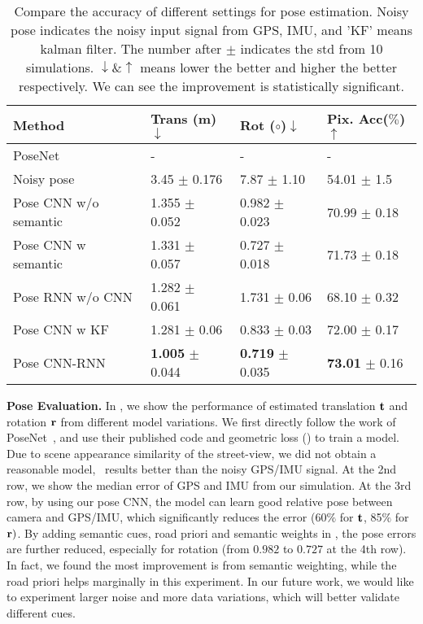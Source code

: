 \begin{table}
\vspace{-0\baselineskip}
\center
\fontsize{7}{8}\selectfont
\hspace*{-0.33cm}

\begin{tabular}{llll}
\toprule[0.1 em]
Method & Trans (m) $\downarrow$ & Rot ($\circ$)$\downarrow$  & Pix. Acc($\%$)$\uparrow$ \\
\hline
PoseNet~\cite{kendall2017geometric} & -  & -  & -  \\
Noisy pose & 3.45 $\pm$ 0.176 & 7.87 $\pm$ 1.10 & 54.01 $\pm$ 1.5 \\
Pose CNN w/o semantic & 1.355 $\pm$ 0.052  & 0.982 $\pm$ 0.023 & 70.99 $\pm$ 0.18 \\
Pose CNN w semantic & 1.331 $\pm$ 0.057  & 0.727 $\pm$ 0.018 & 71.73 $\pm$ 0.18  \\
Pose RNN w/o CNN & 1.282 $\pm$ 0.061  & 1.731 $\pm$ 0.06 &  68.10 $\pm$ 0.32 \\
Pose CNN w KF & 1.281 $\pm$ 0.06  & 0.833 $\pm$ 0.03 & 72.00 $\pm$ 0.17  \\
Pose CNN-RNN  & \textbf{1.005} $\pm$ 0.044  & \textbf{0.719} $\pm$ 0.035  & \textbf{73.01} $\pm$ 0.16  \\
\toprule[0.1 em]
\end{tabular}
\caption{Compare the accuracy of different settings for pose estimation.
Noisy pose indicates the noisy input signal from GPS, IMU, and 'KF' means kalman filter.
The number after $\pm$ indicates the std from 10 simulations. $\downarrow \& \uparrow$ means lower the better and higher the better respectively. 
We can see the improvement is statistically significant.}
\label{tbl:pose}
\vspace{-1.5\baselineskip}
\end{table}

\textbf{Pose Evaluation.}
In , we show the performance of estimated translation ${\mathbf t}$ and rotation ${\mathbf r}$ from different model variations. We first directly follow the work of PoseNet~\cite{Kendall_2015_ICCV,kendall2017geometric}, and use their published code and geometric loss () to train a model. 
Due to scene appearance similarity of the street-view, we did not obtain a reasonable model, \ie~results better than the noisy GPS/IMU signal.
At the 2nd row, we show the median error of GPS and IMU from our simulation. 
At the 3rd row, by using our pose CNN, the model can learn good relative pose between camera and GPS/IMU, which significantly reduces the error (60$\%$ for ${\mathbf t}$, 85$\%$ for ${\mathbf r})$. 
By adding semantic cues, \ie road priori and semantic weights in , the pose errors are further reduced, especially for rotation (from $0.982$ to $0.727$ at the 4th row). In fact, we found the most improvement is from semantic weighting, while the road priori helps marginally in this experiment. In our future work, we would like to experiment larger noise and more data variations, which will better validate different cues.

